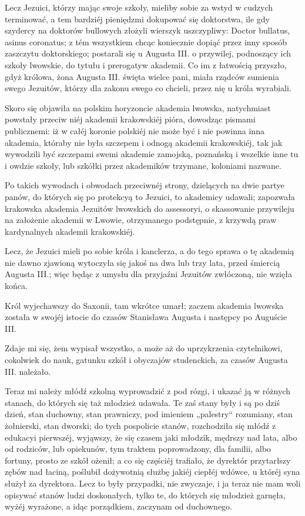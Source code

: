 \documentclass{book}
\begin{document}
Lecz Jezuici, którzy mając swoje szkoły, mieliby sobie za wstyd w cudzych terminować, a tem bardziéj pieniędzmi dokupować się doktorstwa, ile gdy szydercy na doktorów bullowych złożyli wierszyk uszczypliwy: Doctor bullatus, asinus coronatus; z tém wszystkiem chcąc koniecznie dopiąć przez inny sposób zaszczytu doktorskiego; postarali się u Augusta III. o przywilej, podnoszący ich szkoły lwowskie, do tytułu i prerogatyw akademii. Co im z łatwością przyszło, gdyż królowa, żona Augusta III. święta wielce pani, miała rządców sumienia swego Jezuitów, którzy dla zakonu swego co chcieli, przez nię u króla wyrabiali.

Skoro się objawiła na polskim horyzoncie akademia lwowska, natychmiast powstały przeciw niéj akademii krakowskiéj pióra, dowodząc pismami publicznemi: iż w całéj koronie polskiéj nie może być i nie powinna inna akademia, któraby nie była szczepem i odnogą akademii krakowskiéj, tak jak wywodzili być szczepami swemi akademie zamojską, poznańską i wszelkie inne tu i owdzie szkoły, lub szkółki przez akademików trzymane, koloniami nazwane.

Po takich wywodach i obwodach przeciwnéj strony, dzielących na dwie partye panów, do których się po protekcyą to Jezuici, to akademicy udawali; zapozwała krakowska akademia Jezuitów lwowskich do assessoryi, o skassowanie przywileju na założenie akademii w Lwowie, otrzymanego podstępnie, z krzywdą praw kardynalnych akademii krakowskiéj.

Lecz, że Jezuici mieli po sobie króla i kanclerza, a do tego sprawa o tę akademią nie dawno zjawioną wytoczyła się jakoś na dwa lub trzy lata, przed śmiercią Augusta III.; więc będąc z umysłu dla przyjaźni Jezuitów zwłóczoną, nie wzięła końca.

Król wyjechawszy do Saxonii, tam wkrótce umarł; zaczem akademia lwowska została w swojéj istocie do czasów Stanisława Augusta i następcy po Auguście III.

Zdaje mi się, żem wypisał wszystko, a może aż do uprzykrzenia czytelnikowi, cokolwiek do nauk, gatunku szkół i obyczajów studenckich, za czasów Augusta III. należało.

Teraz mi należy młódź szkolną wyprowadzić z pod rózgi, i ukazać ją w różnych stanach, do których się taż młodzież udawała. Te zaś stany były i są po dziś dzień, stan duchowny, stan prawniczy, pod imieniem „palestry“ rozumiany, stan żołnierski, stan dworski; do tych pospolicie stanów, rozchodziła się młódź z edukacyi pierwszéj, wyjąwszy, że się czasem jaki młodzik, mędrszy nad lata, albo od rodziców, lub opiekunów, tym traktem poprowadzony, dla familii, albo fortuny, prosto ze szkół ożenił; a co się częściéj trafiało, że dyrektór przytarłszy zębów nad łaciną, poślubił dożywotnią służbę jakiéj ciepłéj wdówce, u któréj syna służył za dyrektora. Lecz to były przypadki, nie zwyczaje, i ja teraz nie mam woli opisywać stanów ludzi doskonałych, tylko te, do których się młodzież garnęła, wyżéj wyrażone, a idąc porządkiem, zaczynam od duchownego.
\end{document}
